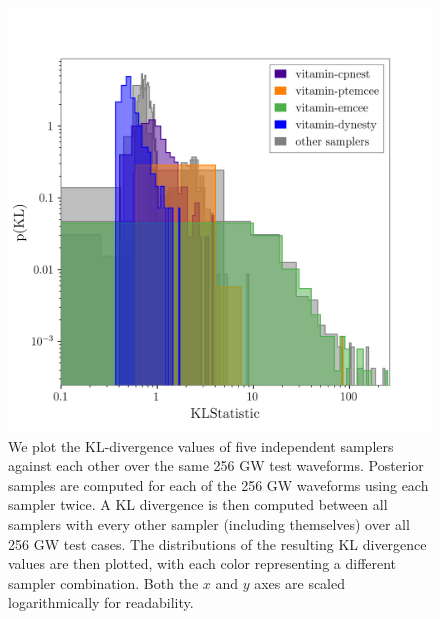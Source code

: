 \documentclass[%
showpacs,
 amsmath,amssymb,
 aps,
 twocolumn,
 prl,
 reprint,
floatfix,
]{revtex4-1}
\newcommand{\chris}[1]{\textbf{\textcolor{red}{CHRIS: #1}}}
\newcommand{\hunter}[1]{\textbf{\textcolor{blue}{HUNTER: #1}}}
\begin{document}

%
%
\begin{figure}
    \includegraphics[width=\columnwidth]{images/hist-kl.png}
    \caption{\label{fig:kl_results} We plot the KL-divergence values of
five independent samplers against each
other over the same 256 \ac{GW} test waveforms. Posterior samples are computed
for each of the 256 \ac{GW} waveforms using each sampler twice. A KL
divergence is then computed between all samplers with every other sampler
(including themselves) over all 256 \ac{GW} test cases. The distributions of the
resulting KL divergence values are then plotted, with each color representing a
different sampler combination. Both the $x$ and $y$ axes are scaled
logarithmically for readability.} %
\end{figure}
%
\end{document}
